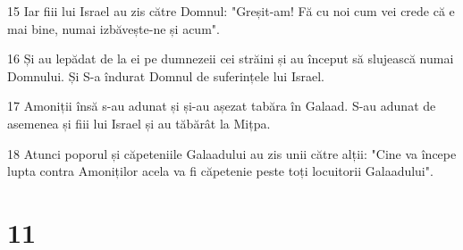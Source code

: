 \par 15 Iar fiii lui Israel au zis către Domnul: "Greșit-am! Fă cu noi cum vei crede că e mai bine, numai izbăvește-ne și acum".
\par 16 Și au lepădat de la ei pe dumnezeii cei străini și au început să slujească numai Domnului. Și S-a îndurat Domnul de suferințele lui Israel.
\par 17 Amoniții însă s-au adunat și și-au așezat tabăra în Galaad. S-au adunat de asemenea și fiii lui Israel și au tăbărât la Mițpa.
\par 18 Atunci poporul și căpeteniile Galaadului au zis unii către alții: "Cine va începe lupta contra Amoniților acela va fi căpetenie peste toți locuitorii Galaadului".

\chapter{11}

